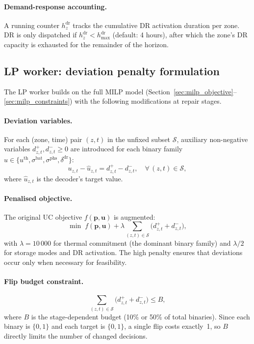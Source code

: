 \documentclass{article}
\begin{document}
\paragraph{Demand-response accounting.}
A running counter $h^{\mathrm{dr}}_z$ tracks the cumulative DR activation duration per zone. DR is only dispatched if $h^{\mathrm{dr}}_z < h^{\mathrm{dr}}_{\max}$ (default: 4 hours), after which the zone's DR capacity is exhausted for the remainder of the horizon.


\subsection{LP worker: deviation penalty formulation}

The LP worker builds on the full MILP model (Section~\ref{sec:milp_objective}--\ref{sec:milp_constraints}) with the following modifications at repair stages.

\paragraph{Deviation variables.}
For each (zone, time) pair $(z, t)$ in the unfixed subset $\mathcal{S}$, auxiliary non-negative variables $d^+_{z,t}, d^-_{z,t} \geq 0$ are introduced for each binary family $u \in \{u^{\mathrm{th}}, \sigma^{\mathrm{bat}}, \sigma^{\mathrm{phs}}, \delta^{\mathrm{dr}}\}$:
\begin{equation}
u_{z,t} - \hat{u}_{z,t} = d^+_{z,t} - d^-_{z,t}, \quad \forall\, (z,t) \in \mathcal{S},
\label{eq:lp_deviation}
\end{equation}
where $\hat{u}_{z,t}$ is the decoder's target value.

\paragraph{Penalised objective.}
The original UC objective $f(\mathbf{p}, \mathbf{u})$ is augmented:
\begin{equation}
\min \; f(\mathbf{p}, \mathbf{u}) + \lambda \!\!\sum_{(z,t) \in \mathcal{S}} \bigl(d^+_{z,t} + d^-_{z,t}\bigr),
\label{eq:lp_penalised}
\end{equation}
with $\lambda = 10\,000$ for thermal commitment (the dominant binary family) and $\lambda/2$ for storage modes and DR activation. The high penalty ensures that deviations occur only when necessary for feasibility.

\paragraph{Flip budget constraint.}
\begin{equation}
\sum_{(z,t) \in \mathcal{S}} \bigl(d^+_{z,t} + d^-_{z,t}\bigr) \leq B,
\label{eq:lp_flip_budget}
\end{equation}
where $B$ is the stage-dependent budget (10\% or 50\% of total binaries). Since each binary is $\{0,1\}$ and each target is $\{0,1\}$, a single flip costs exactly~1, so $B$ directly limits the number of changed decisions.
\end{document}
